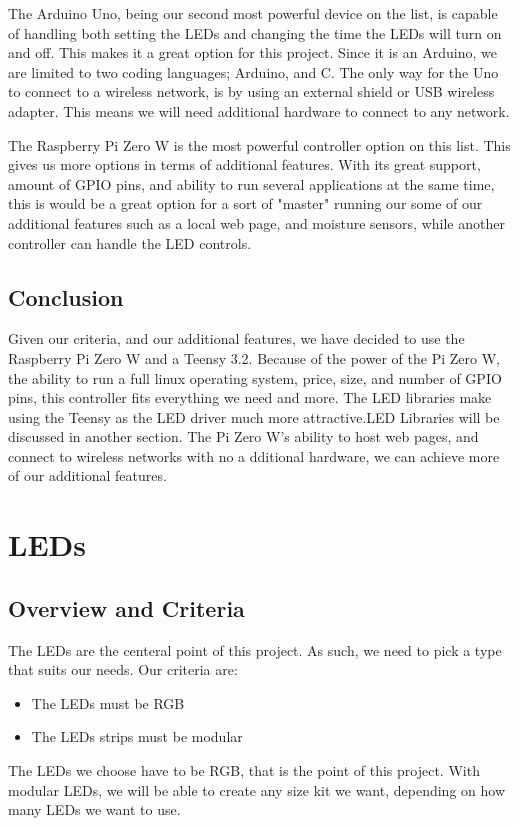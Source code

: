 	\vspace{5mm}
	\noindent The Arduino Uno, being our second most powerful device on the
	list, is capable of handling both setting the LEDs and changing the time
	the LEDs will turn on and off. This makes it a great option for this
	project. Since it is an Arduino, we are limited to two coding languages;
	Arduino, and C. The only way for the Uno to connect to a wireless network,
	is by using an external shield or USB wireless adapter. This means we will
	need additional hardware to connect to any network.


	\vspace{5mm}
	\noindent The Raspberry Pi Zero W is the most powerful controller option on
	this list. This gives us more options in terms of additional
	features. With its great support, amount of GPIO pins, and ability to run
	several applications at the same time, this is would be a great option for
	a sort of "master" running our some of our additional features such as a
	local web page, and moisture sensors, while another controller can handle
	the LED controls.

	\subsection{Conclusion}
	\noindent Given our criteria, and our additional features, we have decided
	to use the Raspberry Pi Zero W and a Teensy 3.2. Because of the power of the
	Pi Zero W, the ability to run a full linux operating system, price, size,
	and number of GPIO pins, this controller fits everything we need and more.
	The LED libraries make using the Teensy as the LED driver much more
	attractive.LED Libraries will be discussed in another section. The Pi Zero
	W's ability to host web pages, and connect to wireless networks with no a
	dditional hardware, we can achieve more of our additional features.

\section{LEDs}
	\subsection{Overview and Criteria}
	\noindent The LEDs are the centeral point of this project. As such, we need
	to pick a type that suits our needs. Our criteria are:
	\begin{itemize}
		\item The LEDs must be RGB
		\item The LEDs strips must be modular
	\end{itemize}
	\noindent The LEDs we choose have to be RGB, that is the point of this
	project. With modular LEDs, we will be able to create any size kit we want,
	depending on how many LEDs we want to use.
